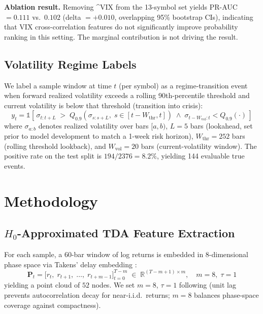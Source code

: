 \documentclass[sigconf]{acmart}
\newcommand{\mathbbm}[1]{\mathbb{#1}}
\begin{document}
\textbf{Ablation result.}
Removing \^{}VIX from the 13-symbol set yields PR-AUC $= 0.111$ vs.\
$0.102$ (delta $= {+}0.010$, overlapping 95\% bootstrap CIs), indicating
that VIX cross-correlation features do not significantly improve probability
ranking in this setting. The marginal contribution is not driving the result.

\subsection{Volatility Regime Labels}

We label a sample window at time $t$ (per symbol) as a regime-transition event
when forward realized volatility exceeds a rolling 90th-percentile threshold
and current volatility is below that threshold (transition into crisis):
%
\begin{equation}
y_t = \mathbbm{1}\!\left[\,\sigma_{t:t+L} \;>\; Q_{0.9}\!\left(\sigma_{s:s+L},\;s \in [t-W_{\mathrm{thr}}, t]\right)
      \;\wedge\; \sigma_{t-W_{\mathrm{vol}}:t} < Q_{0.9}(\cdot)\,\right]
\label{eq:label}
\end{equation}
%
where $\sigma_{a:b}$ denotes realized volatility over bars $[a, b)$,
$L=5$ bars (lookahead, set prior to model development to match a 1-week
risk horizon), $W_{\mathrm{thr}}=252$ bars (rolling threshold lookback),
and $W_{\mathrm{vol}}=20$ bars (current-volatility window). The positive rate on the
test split is $194/2376 = 8.2\%$, yielding 144 evaluable true events.

\section{Methodology}

\subsection{$H_0$-Approximated TDA Feature Extraction}

For each sample, a 60-bar window of log returns is embedded in 8-dimensional
phase space via Takens' delay embedding \cite{takens1981}:
%
\begin{equation}
\mathbf{P}_t = \bigl[r_t,\; r_{t+1},\; \ldots,\; r_{t+m-1}\bigr]_{t=0}^{T-m}
\;\in\; \mathbb{R}^{(T-m+1) \times m},\quad m=8,\;\tau=1
\label{eq:embedding}
\end{equation}
%
yielding a point cloud of $52$ nodes. We set $m{=}8$, $\tau{=}1$ following
\citet{gidea2018} (unit lag prevents autocorrelation decay for near-i.i.d.\
returns; $m{=}8$ balances phase-space coverage against compactness).
\end{document}
